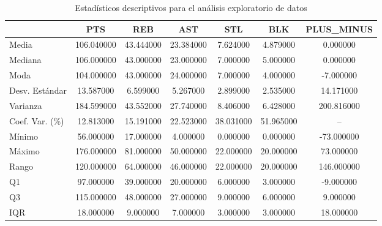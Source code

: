\begin{table}
\caption{Estadísticos descriptivos para el análisis exploratorio de datos}
\label{tab:estadisticos_descriptivos_eda}
\begin{tabular}{|l|c|c|c|c|c|c|}
\toprule
 & PTS & REB & AST & STL & BLK & PLUS\_MINUS \\
\midrule
Media & 106.040000 & 43.444000 & 23.384000 & 7.624000 & 4.879000 & 0.000000 \\
Mediana & 106.000000 & 43.000000 & 23.000000 & 7.000000 & 5.000000 & 0.000000 \\
Moda & 104.000000 & 43.000000 & 24.000000 & 7.000000 & 4.000000 & -7.000000 \\
Desv. Estándar & 13.587000 & 6.599000 & 5.267000 & 2.899000 & 2.535000 & 14.171000 \\
Varianza & 184.599000 & 43.552000 & 27.740000 & 8.406000 & 6.428000 & 200.816000 \\
Coef. Var. (\%) & 12.813000 & 15.191000 & 22.523000 & 38.031000 & 51.965000 & -- \\
Mínimo & 56.000000 & 17.000000 & 4.000000 & 0.000000 & 0.000000 & -73.000000 \\
Máximo & 176.000000 & 81.000000 & 50.000000 & 22.000000 & 20.000000 & 73.000000 \\
Rango & 120.000000 & 64.000000 & 46.000000 & 22.000000 & 20.000000 & 146.000000 \\
Q1 & 97.000000 & 39.000000 & 20.000000 & 6.000000 & 3.000000 & -9.000000 \\
Q3 & 115.000000 & 48.000000 & 27.000000 & 9.000000 & 6.000000 & 9.000000 \\
IQR & 18.000000 & 9.000000 & 7.000000 & 3.000000 & 3.000000 & 18.000000 \\
\bottomrule
\end{tabular}
\end{table}
